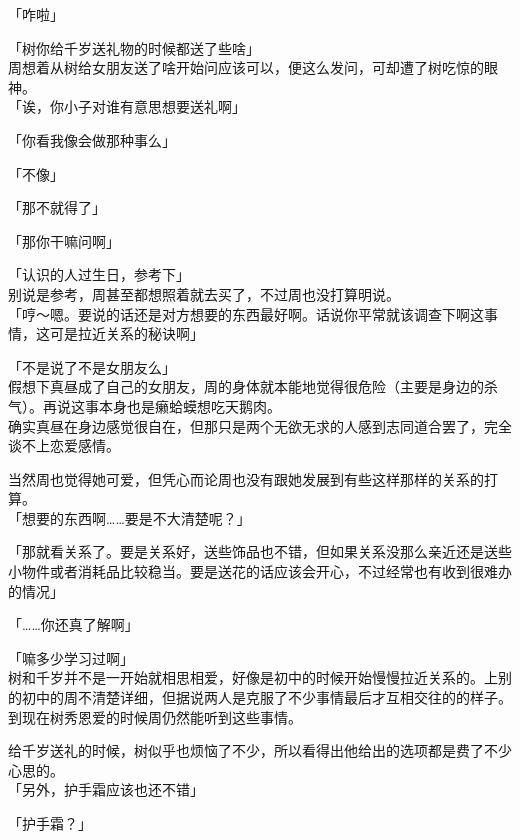 「咋啦」

「树你给千岁送礼物的时候都送了些啥」\\

周想着从树给女朋友送了啥开始问应该可以，便这么发问，可却遭了树吃惊的眼神。\\

「诶，你小子对谁有意思想要送礼啊」

「你看我像会做那种事么」

「不像」

「那不就得了」

「那你干嘛问啊」

「认识的人过生日，参考下」\\

别说是参考，周甚至都想照着就去买了，不过周也没打算明说。\\

「哼～嗯。要说的话还是对方想要的东西最好啊。话说你平常就该调查下啊这事情，这可是拉近关系的秘诀啊」

「不是说了不是女朋友么」\\

假想下真昼成了自己的女朋友，周的身体就本能地觉得很危险（主要是身边的杀气）。再说这事本身也是癞蛤蟆想吃天鹅肉。\\

确实真昼在身边感觉很自在，但那只是两个无欲无求的人感到志同道合罢了，完全谈不上恋爱感情。

当然周也觉得她可爱，但凭心而论周也没有跟她发展到有些这样那样的关系的打算。\\

「想要的东西啊……要是不大清楚呢？」

「那就看关系了。要是关系好，送些饰品也不错，但如果关系没那么亲近还是送些小物件或者消耗品比较稳当。要是送花的话应该会开心，不过经常也有收到很难办的情况」

「……你还真了解啊」

「嘛多少学习过啊」\\

树和千岁并不是一开始就相思相爱，好像是初中的时候开始慢慢拉近关系的。上别的初中的周不清楚详细，但据说两人是克服了不少事情最后才互相交往的的样子。到现在树秀恩爱的时候周仍然能听到这些事情。

给千岁送礼的时候，树似乎也烦恼了不少，所以看得出他给出的选项都是费了不少心思的。\\

「另外，护手霜应该也还不错」

「护手霜？」\\

